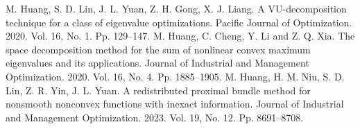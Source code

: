 \documentclass[12pt]{llncs}
\begin{document}
\begin{thebibliography}{9} %
 M. Huang, S. D. Lin, J. L. Yuan, Z. H. Gong, X. J. Liang. A VU-decomposition technique for a class of eigenvalue optimizations. Pacific Journal of Optimization. 2020. Vol. 16, No. 1. Pp. 129--147.
 M. Huang, C. Cheng, Y. Li and Z. Q. Xia. The space decomposition method for the sum of nonlinear convex maximum eigenvalues and its applications. Journal of Industrial and Management Optimization. 2020. Vol. 16, No. 4. Pp. 1885--1905.
  M. Huang, H. M. Niu, S. D. Lin, Z. R. Yin, J. L. Yuan.
A redistributed proximal bundle method for nonsmooth nonconvex functions with inexact information.
Journal of Industrial and Management Optimization. 2023. Vol. 19, No. 12. Pp. 8691--8708.
\end{thebibliography}

\end{document}
